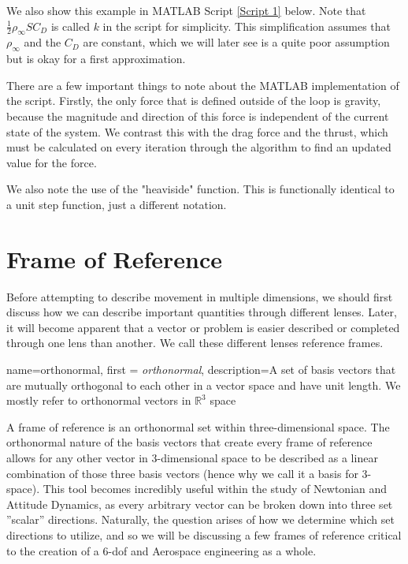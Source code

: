 \documentclass[12pt]{report}
\begin{document}
We also show this example in MATLAB Script \ref{Script 1} below. Note that $\frac{1}{2}\rho_{\infty}SC_D$ is called $k$ in the script for simplicity. This simplification assumes that $\rho_{\infty}$ and the $C_D$ are constant, which we will later see is a quite poor assumption but is okay for a first approximation.

\lstset{style=mystyle}

\label{Script 1}

There are a few important things to note about the MATLAB implementation of the script. Firstly, the only force that is defined outside of the loop is gravity, because the magnitude and direction of this force is independent of the current state of the system. We contrast this with the drag force and the thrust, which must be calculated on every iteration through the algorithm to find an updated value for the force.

We also note the use of the "heaviside" function. This is functionally identical to a unit step function, just a different notation.

\section{Frame of Reference}\label{sec:Frame of Reference}
Before attempting to describe movement in multiple dimensions, we should first discuss how we can describe important quantities through different lenses. Later, it will become apparent that a vector or problem is easier described or completed through one lens than another. We call these different lenses reference frames.

{
    name=orthonormal,
    first = {\textit{orthonormal}},
    description={A set of basis vectors that are mutually orthogonal to each other in a vector space and have unit length. We mostly refer to orthonormal vectors in $\mathbb{R}^3$ space}
}

A frame of reference is an \gls{orthonormal} set within three-dimensional space. The \gls{orthonormal} nature of the basis vectors that create every frame of reference allows for any other vector in 3-dimensional space to be described as a linear combination of those three basis vectors (hence why we call it a basis for 3-space). This tool becomes incredibly useful within the study of Newtonian and Attitude Dynamics, as every arbitrary vector can be broken down into three set ''scalar'' directions. Naturally, the question arises of how we determine which set directions to utilize, and so we will be discussing a few frames of reference critical to the creation of a 6-\gls{dof} and Aerospace engineering as a whole.
\end{document}
